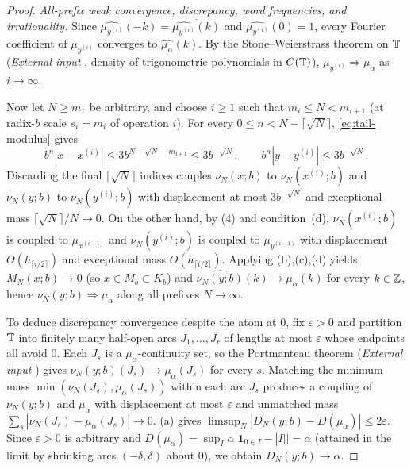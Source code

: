 \documentclass[11pt]{article}
\newcommand{\ind}{\mathbf{1}}
\begin{document}
\begin{proof}
\emph{All-prefix weak convergence, discrepancy, word frequencies, and irrationality.} Since $\widehat{\mu_{y^{(i)}}}(-k)=\overline{\widehat{\mu_{y^{(i)}}}(k)}$ and $\widehat{\mu_{y^{(i)}}}(0)=1$, every Fourier coefficient of $\mu_{y^{(i)}}$ converges to $\widehat{\mu_\alpha}(k)$. By the Stone--Weierstrass theorem on $\mathbb T$ (\emph{External input} \cite{Rudin76}, density of trigonometric polynomials in $C(\mathbb T)$), $\mu_{y^{(i)}}\Rightarrow\mu_\alpha$ as $i\to\infty$.

Now let $N\ge m_1$ be arbitrary, and choose $i\ge1$ such that $m_i\le N<m_{i+1}$ (at radix-$b$ scale $s_i=m_i$ of operation $i$). For every $0\le n<N-\lceil\sqrt N\rceil$, \eqref{eq:tail-modulus} gives
\[
b^n|x-x^{(i)}|\le 3b^{N-\sqrt N-m_{i+1}}\le 3b^{-\sqrt N},\qquad
b^n|y-y^{(i)}|\le 3b^{-\sqrt N}.
\]
Discarding the final $\lceil\sqrt N\rceil$ indices couples $\nu_N(x;b)$ to $\nu_N(x^{(i)};b)$ and $\nu_N(y;b)$ to $\nu_N(y^{(i)};b)$ with displacement at most $3b^{-\sqrt N}$ and exceptional mass $\lceil\sqrt N\rceil/N\to0$. On the other hand, by (4) and condition~(d), $\nu_N(x^{(i)};b)$ is coupled to $\mu_{x^{(i-1)}}$ and $\nu_N(y^{(i)};b)$ is coupled to $\mu_{y^{(i-1)}}$ with displacement $O(h_{\lceil i/2\rceil})$ and exceptional mass $O(h_{\lceil i/2\rceil})$. Applying (b),(c),(d) yields $M_N(x;b)\to0$ (so $x\in M_b\subset K_b$) and $\widehat{\nu_N(y;b)}(k)\to\widehat{\mu_\alpha}(k)$ for every $k\in\mathbb Z$, hence $\nu_N(y;b)\Rightarrow\mu_\alpha$ along all prefixes $N\to\infty$.

To deduce discrepancy convergence despite the atom at $0$, fix $\varepsilon>0$ and partition $\mathbb T$ into finitely many half-open arcs $J_1,\dots,J_r$ of lengths at most $\varepsilon$ whose endpoints all avoid $0$. Each $J_s$ is a $\mu_\alpha$-continuity set, so the Portmanteau theorem (\emph{External input} \cite{Billingsley99}) gives $\nu_N(y;b)(J_s)\to\mu_\alpha(J_s)$ for every $s$. Matching the minimum mass $\min(\nu_N(J_s),\mu_\alpha(J_s))$ within each arc $J_s$ produces a coupling of $\nu_N(y;b)$ and $\mu_\alpha$ with displacement at most $\varepsilon$ and unmatched mass $\sum_s|\nu_N(J_s)-\mu_\alpha(J_s)|\to0$. (a) gives $\limsup_N|D_N(y;b)-D(\mu_\alpha)|\le 2\varepsilon$. Since $\varepsilon>0$ is arbitrary and $D(\mu_\alpha)=\sup_I\alpha|\ind_{0\in I}-|I||=\alpha$ (attained in the limit by shrinking arcs $(-\delta,\delta)$ about $0$), we obtain $D_N(y;b)\to\alpha$.


\end{proof}
\end{document}
